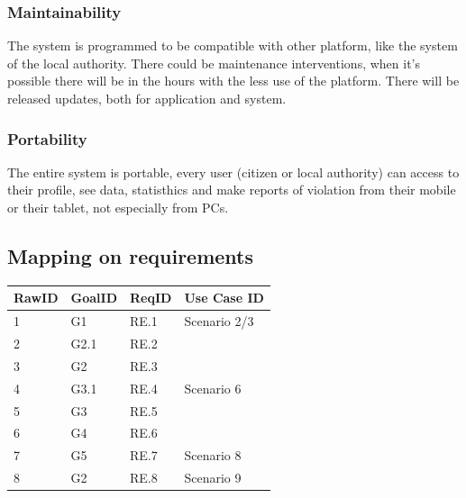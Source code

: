 \subsubsection{Maintainability}
The system is programmed to be compatible with other platform, like the system of the local authority.
There could be maintenance interventions, when it's possible there will be in the hours with the less use of the platform.
There will be released updates, both for application and system.
\subsubsection{Portability}
The entire system is portable, every user (citizen or local authority) can access to their profile, see data, statisthics and make reports of violation from their mobile or their tablet, not especially from PCs.
\subsection{Mapping on requirements}
\begin{center}
	\begin{tabular}{ | l | p{2cm} | p{2cm}| p{2cm}|} 
		\hline
		 RawID & GoalID & ReqID & Use Case ID \\
		\hline
		1&G1&RE.1&Scenario 2/3\\
		\hline
		2&G2.1&RE.2&\\
		\hline
		3&G2&RE.3&\\
		\hline
		4&G3.1&RE.4&Scenario 6\\
		\hline
		5&G3&RE.5&\\
		\hline
		6&G4&RE.6&\\
		\hline
		7&G5&RE.7&Scenario 8\\
		\hline
		8&G2&RE.8&Scenario 9\\
		\hline
	\end{tabular}
\end{center}


 